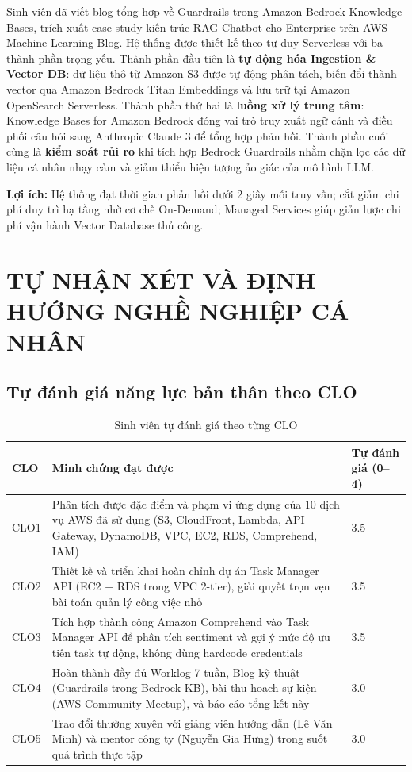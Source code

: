 \documentclass[13pt]{extarticle}
\newcommand{\gvhd}{Lê Văn Minh}
\newcommand{\mentorCT}{Nguyễn Gia Hưng}
\begin{document}
Sinh viên đã viết blog tổng hợp về Guardrails trong Amazon Bedrock Knowledge
Bases, trích xuất case study kiến trúc RAG Chatbot cho Enterprise trên AWS
Machine Learning Blog. Hệ thống được thiết kế theo tư duy Serverless với ba
thành phần trọng yếu. Thành phần đầu tiên là \textbf{tự động hóa Ingestion
\& Vector DB}: dữ liệu thô từ Amazon S3 được tự động phân tách, biến đổi
thành vector qua Amazon Bedrock Titan Embeddings và lưu trữ tại Amazon
OpenSearch Serverless. Thành phần thứ hai là \textbf{luồng xử lý trung tâm}:
Knowledge Bases for Amazon Bedrock đóng vai trò truy xuất ngữ cảnh và điều
phối câu hỏi sang Anthropic Claude 3 để tổng hợp phản hồi. Thành phần cuối
cùng là \textbf{kiểm soát rủi ro} khi tích hợp Bedrock Guardrails nhằm chặn
lọc các dữ liệu cá nhân nhạy cảm và giảm thiểu hiện tượng ảo giác của mô
hình LLM.

\textbf{Lợi ích:} Hệ thống đạt thời gian phản hồi dưới 2 giây mỗi truy
vấn; cắt giảm chi phí duy trì hạ tầng nhờ cơ chế On-Demand; Managed Services
giúp giản lược chi phí vận hành Vector Database thủ công.

\newpage

\section{TỰ NHẬN XÉT VÀ ĐỊNH HƯỚNG NGHỀ NGHIỆP CÁ NHÂN}

\subsection{Tự đánh giá năng lực bản thân theo CLO}

\begin{longtable}{p{1.3cm}p{9cm}p{3cm}}
\caption{Sinh viên tự đánh giá theo từng CLO}
\label{tab:self-clo} \\
\toprule
\textbf{CLO} & \textbf{Minh chứng đạt được} & \textbf{Tự đánh giá (0--4)} \\
\midrule
\endhead
CLO1 & Phân tích được đặc điểm và phạm vi ứng dụng của 10 dịch vụ AWS đã sử
 dụng (S3, CloudFront, Lambda, API Gateway, DynamoDB, VPC, EC2, RDS,
Comprehend, IAM) &
3.5 \\
CLO2 & Thiết kế và triển khai hoàn chỉnh dự án Task Manager API (EC2 + RDS
trong VPC 2-tier), giải quyết trọn vẹn bài toán quản lý công việc nhỏ &
3.5 \\
CLO3 & Tích hợp thành công Amazon Comprehend vào Task Manager API để phân
 tích sentiment và gợi ý mức độ ưu tiên task tự động, không dùng hardcode
credentials &
3.5 \\
CLO4 & Hoàn thành đầy đủ Worklog 7 tuần, Blog kỹ thuật (Guardrails trong
Bedrock KB), bài thu hoạch sự kiện (AWS Community Meetup), và báo cáo
tổng kết này &
3.0 \\
CLO5 & Trao đổi thường xuyên với giảng viên hướng dẫn (\gvhd) và mentor
công ty (\mentorCT) trong suốt quá trình thực tập &
3.0 \\
\bottomrule
\end{longtable}
\end{document}
